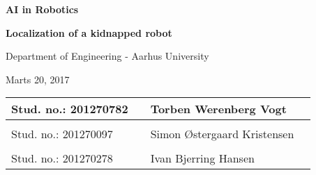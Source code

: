 
\centerline{\Huge\bfseries\color{ThemeColor} AI in Robotics}

\vspace{1em}
\centerline{\Large\bfseries\color{BlackColor} Localization of a kidnapped robot}



\vspace{5em}
\centerline{\large\bfseries\color{BlackColor}}
\centerline{\large\color{BlackColor}Department of Engineering - Aarhus University}

\vspace{0.5em}
\centerline{\large\color{BlackColor} Marts 20, 2017}

\vspace{25em}

\begin{center}
   \begin{tabular}{ l p{3cm} l l }
   Stud. no.: 201270782 && Torben Werenberg Vogt & \\\hline
   & & \\
   Stud. no.: 201270097 && Simon Østergaard Kristensen & \\\hline
   & & \\
   Stud. no.: 201270278 && Ivan Bjerring Hansen & \\\hline
   \end{tabular}
\end{center}
\thispagestyle{empty} %
\restoregeometry

